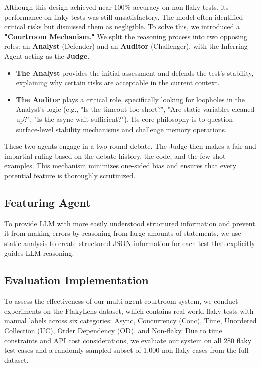 \documentclass{article}
\begin{document}
Although this design achieved near 100\% accuracy on non-flaky tests, its performance on flaky tests was still unsatisfactory. The model often identified critical risks but dismissed them as negligible. To solve this, we introduced a \textbf{"Courtroom Mechanism."} We split the reasoning process into two opposing roles: an \textbf{Analyst} (Defender) and an \textbf{Auditor} (Challenger), with the Inferring Agent acting as the \textbf{Judge}.

\begin{itemize}
    \item \textbf{The Analyst} provides the initial assessment and defends the test's stability, explaining why certain risks are acceptable in the current context.
    \item \textbf{The Auditor} plays a critical role, specifically looking for loopholes in the Analyst's logic (e.g., "Is the timeout too short?", "Are static variables cleaned up?", "Is the async wait sufficient?"). Its core philosophy is to question surface-level stability mechanisms and challenge memory operations.
\end{itemize}

These two agents engage in a two-round debate. The Judge then makes a fair and impartial ruling based on the debate history, the code, and the few-shot examples. This mechanism minimizes one-sided bias and ensures that every potential feature is thoroughly scrutinized.

\subsection{Featuring Agent}
To provide LLM with more easily understood structured information and prevent it from making errors by reasoning from large amounts of statements, we use static analysis to create structured JSON information for each test that explicitly guides LLM reasoning.

\subsection{Evaluation Implementation}

To assess the effectiveness of our multi-agent courtroom system, we conduct experiments on the FlakyLens dataset, which contains real-world flaky tests with manual labels across six categories: Async, Concurrency (Conc), Time, Unordered Collection (UC), Order Dependency (OD), and Non-flaky. Due to time constraints and API cost considerations, we evaluate our system on all 280 flaky test cases and a randomly sampled subset of 1,000 non-flaky cases from the full dataset.
\end{document}
